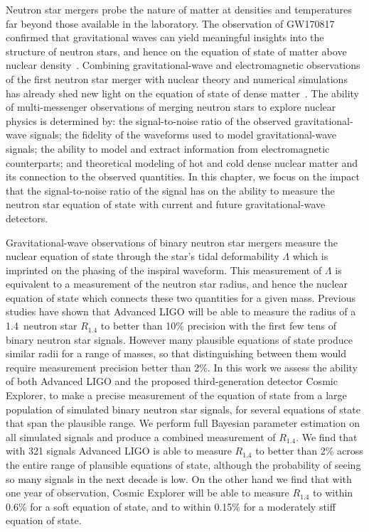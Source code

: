Neutron star mergers probe the nature of matter at densities and temperatures far beyond those available in the laboratory. 
The observation of GW170817 confirmed that gravitational waves can yield meaningful insights into the structure of neutron stars, and hence on the equation of state of matter above nuclear density~\cite{TheLIGOScientific:2017qsa,De:2018uhw,Fattoyev:2017jql,Tews:2018iwm,Margalit:2017dij,Annala:2017llu,Raithel:2018ncd}. Combining gravitational-wave and electromagnetic observations of the first neutron star merger with nuclear theory and numerical simulations has already shed new light on the equation of state of dense matter~\cite{Capano:2019eae,Dietrich:2020efo,AlMamun21}.
The ability of multi-messenger observations of merging neutron stars to
explore nuclear physics is determined by: the signal-to-noise ratio of the observed
gravitational-wave signals; the fidelity of the waveforms used 
to model gravitational-wave signals; the ability to model and extract 
information from electromagnetic counterparts; and
theoretical modeling of hot and cold dense nuclear matter and its 
connection to the observed quantities. In this chapter, we focus on the impact that the signal-to-noise
ratio of the signal has on the ability to measure the neutron star equation of state with current and future gravitational-wave detectors.

Gravitational-wave observations of binary neutron star mergers measure the nuclear equation of state through the star's tidal deformability $\Lambda$ which is imprinted on the phasing of the inspiral waveform. This measurement of $\Lambda$ is equivalent to a measurement of the neutron star radius, and hence the nuclear equation of state which connects these two quantities for a given mass. Previous studies have shown that Advanced LIGO will be able to measure the radius of a 1.4\msun~neutron star $R_{1.4}$ to better than 10\% precision with the first few tens of binary neutron star signals. However many plausible equations of state produce similar radii for a range of masses, so that distinguishing between them would require measurement precision better than 2\%. In this work we assess the ability of both Advanced LIGO and the proposed third-generation detector Cosmic Explorer, to make a precise measurement of the equation of state from a large population of simulated binary neutron star signals, for several equations of state that span the plausible range. We perform full Bayesian parameter estimation on all simulated signals and produce a combined measurement of $R_{1.4}$. We find that with 321 signals Advanced LIGO is able to measure $R_{1.4}$ to better than 2\% across the entire range of plausible equations of state, although the probability of seeing so many signals in the next decade is low. On the other hand we find that with one year of observation, Cosmic Explorer will be able to measure $R_{1.4}$ to within 0.6\% for a soft equation of state, and to within 0.15\% for a moderately stiff equation of state.

